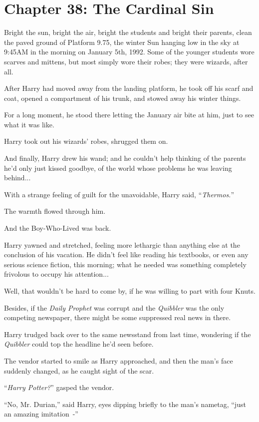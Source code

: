 \chapter{Chapter 38: The Cardinal Sin}
Bright the sun, bright the air, bright the students and bright their parents, clean the paved ground of Platform 9.75, the winter Sun hanging low in the sky at 9:45AM in the morning on January 5th, 1992. Some of the younger students wore scarves and mittens, but most simply wore their robes; they were wizards, after all.

After Harry had moved away from the landing platform, he took off his scarf and coat, opened a compartment of his trunk, and stowed away his winter things.

For a long moment, he stood there letting the January air bite at him, just to see what it was like.

Harry took out his wizards' robes, shrugged them on.

And finally, Harry drew his wand; and he couldn't help thinking of the parents he'd only just kissed goodbye, of the world whose problems he was leaving behind...

With a strange feeling of guilt for the unavoidable, Harry said, ``\emph{Thermos.}''

The warmth flowed through him.

And the Boy-Who-Lived was back.

Harry yawned and stretched, feeling more lethargic than anything else at the conclusion of his vacation. He didn't feel like reading his textbooks, or even any serious science fiction, this morning; what he needed was something completely frivolous to occupy his attention...

Well, that wouldn't be hard to come by, if he was willing to part with four Knuts.

Besides, if the \emph{Daily Prophet} was corrupt and the \emph{Quibbler} was the only competing newspaper, there might be some suppressed real news in there.

Harry trudged back over to the same newsstand from last time, wondering if the \emph{Quibbler} could top the headline he'd seen before.

The vendor started to smile as Harry approached, and then the man's face suddenly changed, as he caught sight of the scar.

``\emph{Harry Potter?}'' gasped the vendor.

``No, Mr. Durian,'' said Harry, eyes dipping briefly to the man's nametag, ``just an amazing imitation~-''

